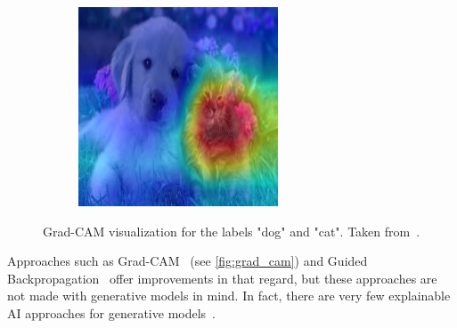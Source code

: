 \begin{figure}[htb]
\begin{subfigure}{0.2\linewidth}
    \end{subfigure}
    \begin{subfigure}{0.2\linewidth}
        \includegraphics[width=\linewidth]{resources/related_works/gradcam_cat.jpg}
    \end{subfigure}
    \caption[Grad-Cam Visualization]{Grad-CAM visualization for the labels "dog" and "cat". Taken from~\textcite{GradCamExample}.}
    \label{fig:grad_cam}
\end{figure}
\par
Approaches such as Grad-CAM~\cite{GradCam} (see \autoref{fig:grad_cam}) and Guided Backpropagation~\cite{guided_backprop} offer improvements in that regard, but these approaches are not made with generative models in mind. In fact, there are very few explainable AI approaches for generative models~\cite{XAI}.
